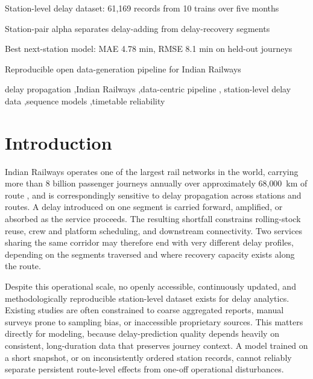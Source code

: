 \documentclass[a4paper,fleqn]{cas-dc}
\begin{document}
\begin{highlights}
\item Station-level delay dataset: 61,169 records from 10 trains over five months
\item Station-pair alpha separates delay-adding from delay-recovery segments
\item Best next-station model: MAE 4.78 min, RMSE 8.1 min on held-out journeys
\item Reproducible open data-generation pipeline for Indian Railways
\end{highlights}

\begin{keywords}
delay propagation \sep Indian Railways \sep data-centric pipeline \sep
station-level delay data \sep sequence models \sep timetable reliability
\end{keywords}

\maketitle

\section{Introduction}

Indian Railways operates one of the largest rail networks in the world,
carrying more than 8 billion passenger journeys annually over approximately
68{,}000~km of route \citep{indian_railways_stats}, and is correspondingly
sensitive to delay propagation across stations and routes. A delay introduced
on one segment is carried forward, amplified, or absorbed as the service
proceeds. The resulting shortfall constrains rolling-stock reuse, crew and
platform scheduling, and downstream connectivity. Two services sharing the same
corridor may therefore end with very different delay profiles, depending on
the segments traversed and where recovery capacity exists along the route.

Despite this operational scale, no openly accessible, continuously updated,
and methodologically reproducible station-level dataset exists for delay
analytics. Existing studies are often constrained to coarse aggregated
reports, manual surveys prone to sampling bias, or inaccessible proprietary
sources. This matters directly for modeling, because delay-prediction quality
depends heavily on consistent, long-duration data that preserves journey
context. A model trained on a short snapshot, or on inconsistently ordered
station records, cannot reliably separate persistent route-level effects from
one-off operational disturbances.
\end{document}
